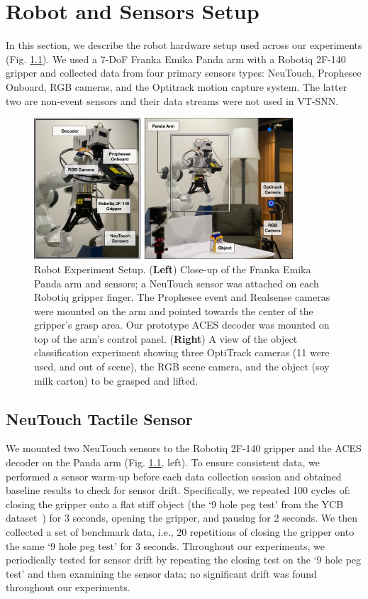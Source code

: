 \documentclass[fyp]{socreport}
\begin{document}
\chapter{Robot and Sensors Setup\label{cha:exp_setup}}

In this section, we describe the robot hardware setup used across our
experiments (Fig. \ref{fig:robotsetup}). We used a 7-DoF Franka Emika Panda arm
with a Robotiq 2F-140 gripper and collected data from four primary sensors
types: NeuTouch, Prophesee Onboard, RGB cameras, and the Optitrack motion
capture system. The latter two are non-event sensors and their data streams were
not used in VT-SNN.

\begin{figure}
  \centering
  \includegraphics[width=0.86\textwidth]{images/robotsetup/robot_setup_wsensors.pdf}
  \caption{Robot Experiment Setup. (\textbf{Left}) Close-up of the Franka Emika
    Panda arm and sensors; a NeuTouch sensor was attached on each Robotiq
    gripper finger. The Prophesee event and Realsense cameras were mounted on
    the arm and pointed towards the center of the gripper's grasp area. Our
    prototype ACES decoder was mounted on top of the arm's control panel.
    (\textbf{Right}) A view of the object classification experiment showing
    three OptiTrack cameras (11 were used, and out of scene), the RGB scene
    camera, and the object (soy milk carton) to be grasped and lifted.}
\label{fig:robotsetup}
\end{figure}

\section{NeuTouch Tactile Sensor}
We mounted two NeuTouch sensors to the Robotiq 2F-140 gripper and the ACES
decoder on the Panda arm (Fig. \ref{fig:robotsetup}, left). To ensure consistent
data, we performed a sensor warm-up before each data collection session and
obtained baseline results to check for sensor drift. Specifically, we repeated
100 cycles of: closing the gripper onto a flat stiff object (the `9 hole peg
test' from the YCB dataset~\cite{ycb2015}) for 3 seconds, opening the gripper,
and pausing for 2 seconds. We then collected a set of benchmark data, i.e., 20
repetitions of closing the gripper onto the same `9 hole peg test' for 3
seconds. Throughout our experiments, we periodically tested for sensor drift by
repeating the closing test on the `9 hole peg test' and then examining the
sensor data; no significant drift was found throughout our experiments.
\end{document}
